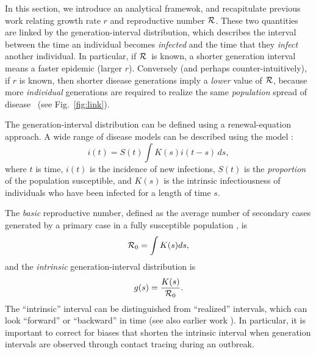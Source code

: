 \documentclass[12pt]{article}
\newcommand{\RR}{\ensuremath{{\cal R}}}
\newcommand{\Rx}[1]{\ensuremath{{\cal R}_{#1}}}
\newcommand{\Ro}{\Rx{0}}
\newcommand{\fref}[1]{Fig.~\ref{fig:#1}}
\begin{document}
In this section, we introduce an analytical framewok, and recapitulate previous work relating growth rate $r$ and reproductive number \RR.
These two quantities are linked by the generation-interval distribution, which describes the interval between the time an individual becomes \emph{infected} and the time that they \emph{infect} another individual.
In particular, if \RR~is known, a shorter generation interval means a faster epidemic (larger $r$). Conversely (and perhaps counter-intuitively), if $r$ is known, then shorter disease generations imply a \emph{lower} value of \RR, because more \emph{individual} generations are required to realize the same \emph{population} spread of disease \cite{EatoHall14,PoweKret14}~(see \fref{link}).

The generation-interval distribution can be defined using a renewal-equation approach.
A wide range of disease models can be described using the model 
\cite{heesterbeek1996concept,diekmann2000mathematical,roberts2004modelling,aldis2005integral,WallLips07,roberts2007model}:
\begin{equation}
i(t) = S(t)\int{K(s)i(t-s) \,ds},
\label{eq:Renewal}
\end{equation}
where $t$ is time, $i(t)$ is the incidence of new infections, $S(t)$ is the \emph{proportion} of the population susceptible, and $K(s)$ is the intrinsic infectiousness of individuals who have been infected for a length of time $s$.

The \emph{basic} reproductive number, defined as the average number of secondary cases generated by a primary case in a fully susceptible population \cite{AndeMay91, DiekHees90}, is
\begin{equation}
\Ro = \int{K(s)ds},
\end{equation}
and the \emph{intrinsic} generation-interval distribution is
\begin{equation}
g(s) = \frac{K(s)}{\Ro}.
\end{equation}
The ``intrinsic'' interval can be distinguished from ``realized'' intervals, which can look ``forward'' or ``backward'' in time \cite{ChamDush15} (see also earlier work \cite{Sven07,Nish10}). 
In particular, it is important to correct for biases that shorten the intrinsic interval when generation intervals are observed through contact tracing during an outbreak.
\end{document}
